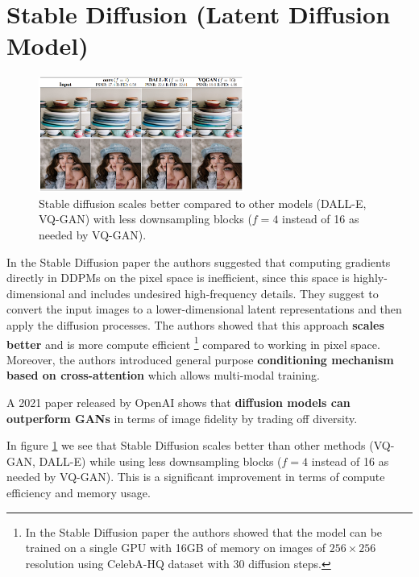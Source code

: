 \section{Stable Diffusion (Latent Diffusion Model)}
\label{sec:stable_diffusion}


\begin{figure}
    \centering
    \includegraphics[width=0.6\textwidth]{images/diffusion_models/stable_diffusion/stable_diffusion.png}
    \caption{Stable diffusion scales better compared to other models \cite{stable_diffusion} (DALL-E, VQ-GAN) with less downsampling blocks ($f = 4$ instead of 16 as needed by VQ-GAN).}
    \label{fig:stable_diffusion_less_downsampling_blocks}
\end{figure}


In the Stable Diffusion paper \cite{stable_diffusion} the authors suggested that computing gradients directly in DDPMs on the pixel space is inefficient, since this space is highly-dimensional and includes undesired high-frequency details. They suggest to convert the input images to a lower-dimensional latent representations and then apply the diffusion processes. The authors showed that this approach \textbf{scales better} and is more compute efficient \footnote{In the Stable Diffusion paper \cite{stable_diffusion} the authors showed that the model can be trained on a single GPU with 16GB of memory on images of $256\times 256$ resolution using CelebA-HQ dataset with 30 diffusion steps.} compared to working in pixel space. Moreover, the authors introduced general purpose \textbf{conditioning mechanism based on cross-attention} which allows multi-modal training.

A 2021 paper released by OpenAI \cite{openai_diffusion_beats_gans} shows that \textbf{diffusion models can outperform GANs} in terms of image fidelity by trading off diversity.

In figure \ref{fig:stable_diffusion_less_downsampling_blocks} we see that Stable Diffusion scales better than other methods (VQ-GAN, DALL-E) while using less downsampling blocks ($f = 4$ instead of 16 as needed by VQ-GAN). This is a significant improvement in terms of compute efficiency and memory usage.










